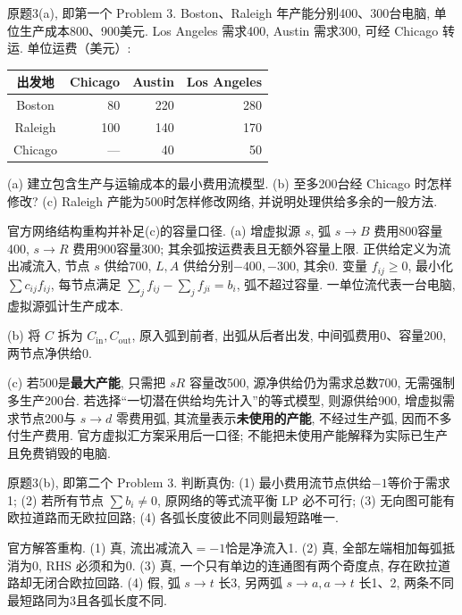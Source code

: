 \begin{exercise}\label{ass:15053-rec9-q3a}
原题3(a), 即第一个 Problem 3. Boston、Raleigh 年产能分别400、300台电脑, 单位生产成本800、900美元. Los Angeles 需求400, Austin 需求300, 可经 Chicago 转运. 单位运费（美元）:
\begin{center}\begin{tabular}{c|rrr}出发地&Chicago&Austin&Los Angeles\\\hline
Boston&80&220&280\\Raleigh&100&140&170\\Chicago&---&40&50
\end{tabular}\end{center}
(a) 建立包含生产与运输成本的最小费用流模型. (b) 至多200台经 Chicago 时怎样修改? (c) Raleigh 产能为500时怎样修改网络, 并说明处理供给多余的一般方法.
\end{exercise}
\begin{solution}
官方网络结构重构并补足(c)的容量口径. (a) 增虚拟源 $s$, 弧 $s\to B$ 费用800容量400, $s\to R$ 费用900容量300; 其余弧按运费表且无额外容量上限. 正供给定义为流出减流入, 节点 $s$ 供给700, $L,A$ 供给分别$-400,-300$, 其余0. 变量 $f_{ij}\ge0$, 最小化 $\sum c_{ij}f_{ij}$, 每节点满足 $\sum_jf_{ij}-\sum_jf_{ji}=b_i$, 弧不超过容量. 一单位流代表一台电脑, 虚拟源弧计生产成本.

(b) 将 $C$ 拆为 $C_{\mathrm{in}},C_{\mathrm{out}}$, 原入弧到前者, 出弧从后者出发, 中间弧费用0、容量200, 两节点净供给0.

(c) 若500是\textbf{最大产能}, 只需把 $sR$ 容量改500, 源净供给仍为需求总数700, 无需强制多生产200台. 若选择“一切潜在供给均先计入”的等式模型, 则源供给900, 增虚拟需求节点200与 $s\to d$ 零费用弧, 其流量表示\textbf{未使用的产能}, 不经过生产弧, 因而不多付生产费用. 官方虚拟汇方案采用后一口径; 不能把未使用产能解释为实际已生产且免费销毁的电脑.
\end{solution}

\begin{exercise}\label{ass:15053-rec9-q3b}
原题3(b), 即第二个 Problem 3. 判断真伪: (1) 最小费用流节点供给$-1$等价于需求1; (2) 若所有节点 $\sum b_i\ne0$, 原网络的等式流平衡 LP 必不可行; (3) 无向图可能有欧拉道路而无欧拉回路; (4) 各弧长度彼此不同则最短路唯一.
\end{exercise}
\begin{solution}
官方解答重构. (1) 真, 流出减流入$=-1$恰是净流入1. (2) 真, 全部左端相加每弧抵消为0, RHS 必须和为0. (3) 真, 一个只有单边的连通图有两个奇度点, 存在欧拉道路却无闭合欧拉回路. (4) 假, 弧 $s\to t$ 长3, 另两弧 $s\to a,a\to t$ 长1、2, 两条不同最短路同为3且各弧长度不同.
\end{solution}

